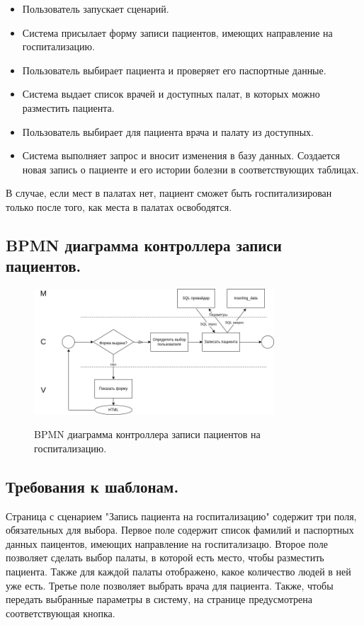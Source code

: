 \documentclass[12pt, a4paper]{article}
\begin{document}
    \begin{itemize}
    	\item {Пользователь запускает сценарий.}
    	\item {Система присылает форму записи пациентов, имеющих направление на госпитализацию.}
    	\item {Пользователь выбирает пациента и проверяет его паспортные данные.}
    	\item {Система выдает список врачей и доступных палат, в которых можно разместить пациента.}
    	\item {Пользователь выбирает для пациента врача и палату из доступных.}
    	\item {Система выполняет запрос и вносит изменения в базу данных. Создается новая запись о пациенте и его истории болезни в соответствующих таблицах.}
    \end{itemize}

    В случае, если мест в палатах нет, пациент сможет быть госпитализирован только после того, как места в палатах освободятся.
	
	\subsection{BPMN диаграмма контроллера записи пациентов.}
	\begin{figure}[ht!]
		\centering    %
		\includegraphics[width=0.8\textwidth]{pictures/referralGospitalize.png}
		\label{fig:pic9} %
		\caption{BPMN диаграмма контроллера записи пациентов на госпитализацию.}
	\end{figure}

   \subsection{Требования к шаблонам.}
   
   Страница с сценарием "Запись пациента на госпитализацию" содержит три поля, обязательных для выбора. Первое поле содержит список фамилий и паспортных данных паицентов, имеющих направление на госпитализацю. Второе поле позволяет сделать выбор палаты, в которой есть место, чтобы разместить пациента. Также для каждой палаты отображено, какое количество людей в ней уже есть. Третье поле позволяет выбрать врача для пациента. Также, чтобы передать выбранные параметры в систему, на странице предусмотрена соответствующая кнопка.
   
\end{document}
